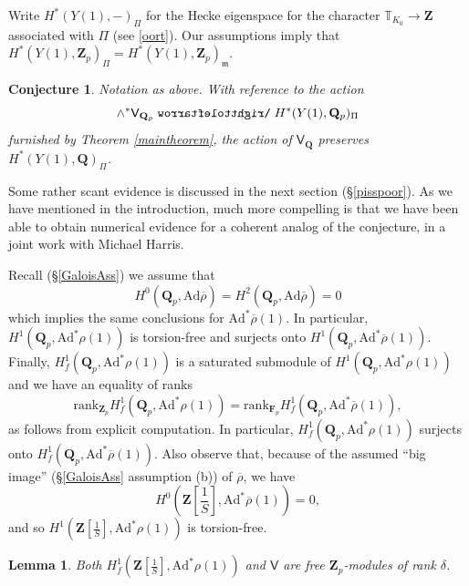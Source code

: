 \documentclass[10pt]{amsart}
\def\acts{\mathrel{\reflectbox{$\righttoleftarrow$}}}
\newcommand{\Z}{\mathbf{Z}}
\newcommand{\Ad}{\mathrm{Ad}}
\newcommand{\rhobar}{\overline{\rho}}
\newcommand{\Q}{\mathbf{Q}}
\newcommand{\ramprimes}{S}
\newtheorem{conjecture}[subsection]{Conjecture}
\newtheorem{lemma}[subsection]{Lemma}
\theoremstyle{remark}
\begin{document}
 Write $H^*(Y(1), -)_{\Pi}$ for the 
Hecke eigenspace for the character $\mathbb{T}_{K_0} \rightarrow \mathbf{Z}$
 associated with $\Pi$ (see \eqref{oort}).   Our assumptions imply that $H^*(Y(1), \Z_p)_{\Pi}
 = H^*(Y(1), \Z_p)_{\mathfrak{m}}$. 

\begin{conjecture}     \label{mainconjecture} 
 Notation as above. With reference to the action
 $$ \wedge^* \mathsf{V}_{\Q_p} \acts H^*(Y(1), \Q_p)_{\Pi}$$
 furnished by Theorem \ref{maintheorem}, the action of $\mathsf{V}_{\Q}$
 preserves $H^*(Y(1), \Q)_{\Pi}$. 
\end{conjecture} 



  Some rather scant evidence is discussed in the next section  (\S \ref{pisspoor}).   As we have mentioned in the introduction, 
  much more compelling is that we have been able
to obtain numerical evidence for a coherent analog of the conjecture, in a joint work with Michael Harris. 


 
 
  
 
Recall  (\S \ref{GaloisAss}) 
we assume that 
%
%
%
%
%
\begin{equation} \label{recall} H^0(\Q_p, \Ad \rhobar) = H^2(\Q_p, \Ad \rhobar) = 0\end{equation} 
which implies the same conclusions for $\Ad^* \rhobar(1)$. 
In  particular,  $H^1(\Q_p, \Ad^* \rho(1))$ is torsion-free and surjects
 onto $H^1(\Q_p, \Ad^* \rhobar(1))$. 
  Finally, $H^1_f(\Q_p, \Ad^* \rho(1))$ is a saturated submodule of $H^1(\Q_p, \Ad^* \rho(1))$ and we have an equality of ranks
 $$\mathrm{rank}_{\Z_p} H^1_f(\Q_p, \Ad^* \rho(1)) = \mathrm{rank}_{\mathbf{F}_p} H^1_f(\Q_p, \Ad^* \rhobar(1)),$$
 as follows from explicit computation. In particular, $H^1_f(\Q_p,\Ad^* \rho(1))$ surjects onto $H^1_f(\Q_p, \Ad^* \rhobar(1))$.  
Also   observe that, because of the assumed ``big image'' (\S \ref{GaloisAss} assumption (b)) of $\rhobar$, we have 
\begin{equation} \label{h00} H^0(\Z[\frac{1}{\ramprimes}], \Ad^* \rhobar(1)) = 0,\end{equation}
  and so $H^1(\Z[\frac{1}{\ramprimes}], \Ad^* \rho(1))$ is torsion-free. 

 \begin{lemma} \label{DeltaDimensional}  Both $ H^1_f(\Z[\frac{1}{\ramprimes}], \Ad^* \rho(1))$ and $\mathsf{V}$ are  free  $\Z_p$-modules of rank $\delta$.
 \end{lemma}
 \proof  
 
\end{document}
